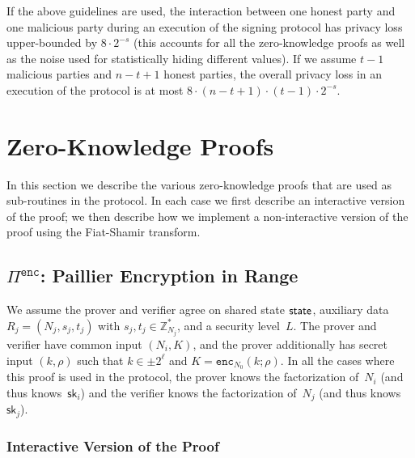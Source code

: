 \documentclass[11pt]{article}
\def\state{{\sf state}}
\newcommand{\enc}{\ensuremath{\mathtt{enc}}}
\newcommand{\proof}[1]{\ensuremath{\Pi^{\mathtt{#1}}}}
\newcommand{\sk}{\textsf{sk}}
\newcommand{\Z}{\mathbb{Z}}
\newcommand{\?}[1]{\stackrel{?}{#1}}
\begin{document}
If the above guidelines are used, 
the interaction between one honest party and one malicious party during an execution of the signing protocol has privacy loss upper-bounded by $8 \cdot 2^{-s}$ (this accounts for all the zero-knowledge proofs as well as the noise used for statistically hiding different values). 
If we assume $t-1$ malicious parties and $n-t+1$ honest parties, the overall privacy loss in an execution of the protocol is at most $8\cdot (n-t+1)\cdot (t-1) \cdot 2^{-s}$.

\section{Zero-Knowledge Proofs}
In this section we describe the various zero-knowledge proofs that are used as sub-routines in the protocol. In each case we first describe an interactive version of the proof; we then describe how we implement a non-interactive version of the proof using the Fiat-Shamir transform.

\subsection{$\proof{enc}$: Paillier Encryption in Range}

We assume the prover and verifier agree on shared state $\state$, auxiliary data $R_j = (N_j, s_j, t_j)$ with $s_j, t_j \in \Z^*_{N_j}$, and a security level~$L$. 
The prover and verifier have common input $(N_i, K)$, and the prover additionally has 
secret input $(k, \rho)$ such that $k \in \pm 2^\ell$ and $K = \enc_{N_0}(k; \rho)$.
In all the cases where this proof is used in the protocol, the prover knows the factorization of~$N_i$ (and thus knows~$\sk_i$) and the verifier knows the factorization of~$N_j$ (and thus knows $\sk_j$).

\subsubsection{Interactive Version of the Proof}
\end{document}
